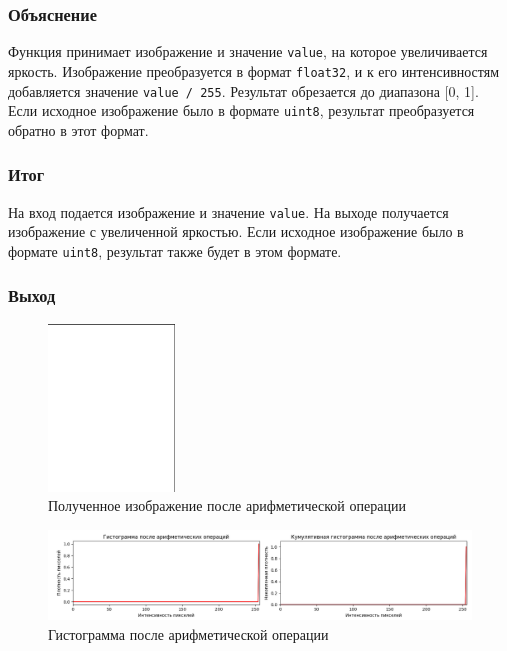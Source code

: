 \documentclass[a4paper,12pt]{article}
\begin{document}
\subsubsection{Объяснение}
Функция принимает изображение и значение \texttt{value}, на которое увеличивается яркость. Изображение преобразуется в формат \texttt{float32}, и к его интенсивностям добавляется значение \texttt{value / 255}. Результат обрезается до диапазона [0, 1]. Если исходное изображение было в формате \texttt{uint8}, результат преобразуется обратно в этот формат.

\subsubsection{Итог}
На вход подается изображение и значение \texttt{value}. На выходе получается изображение с увеличенной яркостью. Если исходное изображение было в формате \texttt{uint8}, результат также будет в этом формате.

\subsubsection{Выход}

\begin{figure}[H]
    \centering
    \includegraphics[width=0.3\textwidth]{im/imАрифметика.png}
    \caption{Полученное изображение после арифметической операции}
    \label{fig:arithmetic_image}
\end{figure}

\begin{figure}[H]
    \centering
    \includegraphics[width=1\textwidth]{im/гистограммаАрифметика.png}
    \caption{Гистограмма после арифметической операции}
    \label{fig:arithmetic_histogram}
\end{figure}
\end{document}
